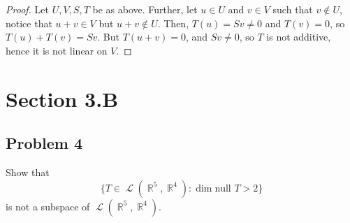 \documentclass[letterpaper, 12pt]{amsart}
\DeclareMathOperator{\R}{\mathbb{R}}
\renewcommand{\null}{\text{null }}
\DeclareMathOperator{\Ell}{\mathscr{L}}
\theoremstyle{definition}  %
\begin{document}
		\begin{proof}
		Let $U,V,S,T$ be as above.
		Further, let $u \in U$ and $v \in V$ such that $v \notin U$, notice that $u+v \in V$ but $u+v \notin U$.
		Then, $T(u) = Sv \neq 0$ and $T(v) = 0$, so $T(u) + T(v) = Sv$.
		But $T(u+v) = 0$, and $Sv \neq 0$, so $T$ is not additive, hence it is not linear on $V$.
		\end{proof}

	\section*{Section 3.B}
		\subsection*{Problem 4}
		Show that $$\{ T \in \Ell(\R^{5}, \R^{4}) : \dim \null T > 2 \}$$ is not a subspace of $\Ell(\R^{5}, \R^{4})$.
\end{document}
